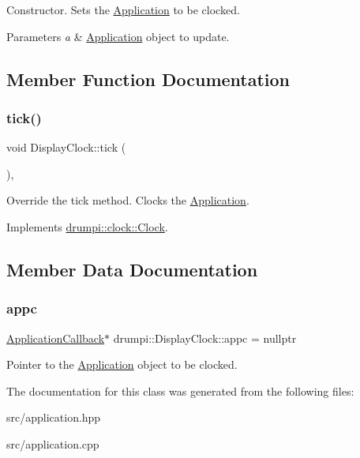 Constructor. Sets the \hyperlink{classdrumpi_1_1Application}{Application} to be clocked. 
\begin{DoxyParams}{Parameters}
{\em a} & \hyperlink{classdrumpi_1_1Application}{Application} object to update. \\
\hline
\end{DoxyParams}


\subsection{Member Function Documentation}
\mbox{\label{classdrumpi_1_1DisplayClock_ae44b216f4788398ab3d67da7141fa88f}} 
\subsubsection{\texorpdfstring{tick()}{tick()}}
{\footnotesize\ttfamily void Display\+Clock\+::tick (\begin{DoxyParamCaption}{ }\end{DoxyParamCaption})\hspace{0.3cm}{\ttfamily [override]}, {\ttfamily [virtual]}}

Override the tick method. Clocks the \hyperlink{classdrumpi_1_1Application}{Application}. 

Implements \hyperlink{classdrumpi_1_1clock_1_1Clock_ade9259c06e6b90bbd92e155a2506d3a1}{drumpi\+::clock\+::\+Clock}.



\subsection{Member Data Documentation}
\mbox{\label{classdrumpi_1_1DisplayClock_a85d58654905b372a83fa258ab2d5a1b0}} 
\subsubsection{\texorpdfstring{appc}{appc}}
{\footnotesize\ttfamily \hyperlink{classdrumpi_1_1ApplicationCallback}{Application\+Callback}$\ast$ drumpi\+::\+Display\+Clock\+::appc = nullptr\hspace{0.3cm}{\ttfamily [private]}}

Pointer to the {\ttfamily \hyperlink{classdrumpi_1_1Application}{Application}} object to be clocked. 

The documentation for this class was generated from the following files\+:\begin{DoxyCompactItemize}
\item 
src/application.\+hpp\item 
src/application.\+cpp\end{DoxyCompactItemize}
